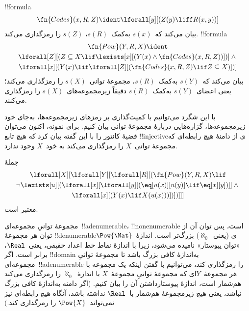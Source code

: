 \documentclass[../../../include/open-logic-section]{subfiles}
\begin{document}
\begin{prop}
!!{formula}
  \[
  \fn{Codes}(x, R, Z) \ident \lforall[y][(Z(y) \liff
    R(x, y))]
  \]
بیان می‌کند که~$s(x)$ به‌کمک~$s(R)$، $s(Z)$ را رمزگذاری می‌کند.
!!{formula}
\begin{multline*}
  \fn{Pow}(Y, R, X) \ident \\
  \lforall[Z][(Z \subseteq X \lif \lexists[x][(Y(x) \land
    \fn{Codes}(x, R, Z))])] \land {} \\ \lforall[x][(Y(x) \lif
  \lforall[Z][(\fn{Codes}(x, R, Z) \lif Z \subseteq X)])]
\end{multline*}
بیان می‌کند که~$s(Y)$ به‌کمک~$s(R)$، مجموعهٔ توانی~$s(X)$ را رمزگذاری
می‌کند؛ یعنی اعضای~$s(Y)$ به‌کمک~$s(R)$ دقیقاً زیرمجموعه‌های~$s(X)$ را
رمزگذاری می‌کنند.
\end{prop}

\begin{explain}
با این شگرد می‌توانیم با کمیت‌گذاری بر رمزهای زیرمجموعه‌ها، به‌جای خود
زیرمجموعه‌ها، گزاره‌هایی دربارهٔ مجموعهٔ توانی بیان کنیم. برای نمونه،
اکنون می‌توان قضیهٔ کانتور را با این گفته بیان کرد که هیچ تابع
!!{injective}ی از دامنهٔ هیچ رابطه‌ای که مجموعهٔ توانی~$X$ را رمزگذاری
می‌کند به خود~$X$ وجود ندارد.
\end{explain}

\begin{prop}
جملهٔ
\begin{multline*}
  \lforall[X][\lforall[Y][\lforall[R][(\fn{Pow}(Y, R, X) \lif \\
      \lnot \lexists[u][(\lforall[x][\lforall[y][(\eq[u(x)][u(y)] \lif
            \eq[x][y])]] \land {}\\
        \lforall[x][(Y(x) \lif X(u(x)))])])]]]
\end{multline*}
معتبر است.
\end{prop}

\begin{explain}
مجموعهٔ توانیِ مجموعه‌ای~!!a{denumerable}، !!{nonenumerable} است، پس توان
آن از توان هر مجموعهٔ !!{denumerable}ی (یعنی~$\aleph_0$) بزرگ‌تر است.
اندازهٔ~$\Pow{\Nat}$ «توان پیوستار» نامیده می‌شود، زیرا با اندازهٔ نقاط
خط اعداد حقیقی، یعنی~$\Real$، برابر است. اگر !!{domain} به‌اندازهٔ کافی
بزرگ باشد تا مجموعهٔ توانیِ مجموعه‌ای~!!a{denumerable} را رمزگذاری کند،
می‌توانیم با گفتن اینکه یک مجموعه با هر مجموعهٔ~$Y$ای که مجموعهٔ توانیِ
مجموعهٔ~$X$ با اندازهٔ~$\aleph_0$ را رمزگذاری می‌کند هم‌شمار است،
اندازهٔ پیوستارداشتن آن را بیان کنیم. (اگر دامنه به‌اندازهٔ کافی بزرگ
نباشد، یعنی هیچ زیرمجموعهٔ هم‌شمار با~$\Real$ نداشته باشد، آنگاه هیچ
رابطه‌ای نیز نمی‌تواند~$\Pow{X}$ را رمزگذاری کند.)
\end{explain}
\end{document}
